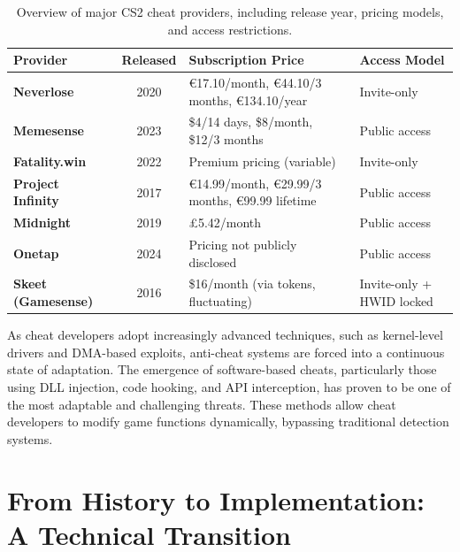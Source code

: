 \begin{table}[h!]
    \centering
    \renewcommand{\arraystretch}{1.4}
    \begin{tabular}{|p{3.2cm}|c|p{4cm}|p{3.8cm}|}
        \hline
        \textbf{Provider} & \textbf{Released} & \textbf{Subscription Price} & \textbf{Access Model} \\
        \hline
        \textbf{Neverlose} \parencite{neverlose2020} & 2020 & €17.10/month, €44.10/3 months, €134.10/year & Invite-only \\
        \hline
        \textbf{Memesense} \parencite{memesense2023} & 2023 & \$4/14 days, \$8/month, \$12/3 months & Public access \\
        \hline
        \textbf{Fatality.win} \parencite{fatality2022} & 2022 & Premium pricing (variable) & Invite-only \\
        \hline
        \textbf{Project Infinity} \parencite{projectinfinity2017} & 2017 & €14.99/month, €29.99/3 months, €99.99 lifetime & Public access \\
        \hline
        \textbf{Midnight} \parencite{midnight2019} & 2019 & £5.42/month & Public access \\
        \hline
        \textbf{Onetap} \parencite{onetap2024} & 2024 & Pricing not publicly disclosed & Public access \\
        \hline
        \textbf{Skeet (Gamesense)} \parencite{skeet2016} & 2016 & \$16/month (via tokens, fluctuating) & Invite-only + HWID locked \\
        \hline
    \end{tabular}
    \caption{Overview of major CS2 cheat providers, including release year, pricing models, and access restrictions.}
    \label{tab:cs2_cheat_providers}
\end{table}






As cheat developers adopt increasingly advanced techniques, such as kernel-level drivers and DMA-based exploits, anti-cheat systems are forced into a continuous state of adaptation. The emergence of software-based cheats, particularly those using DLL injection, code hooking, and API interception, has proven to be one of the most adaptable and challenging threats. These methods allow cheat developers to modify game functions dynamically, bypassing traditional detection systems.


\section*{From History to Implementation: A Technical Transition}

